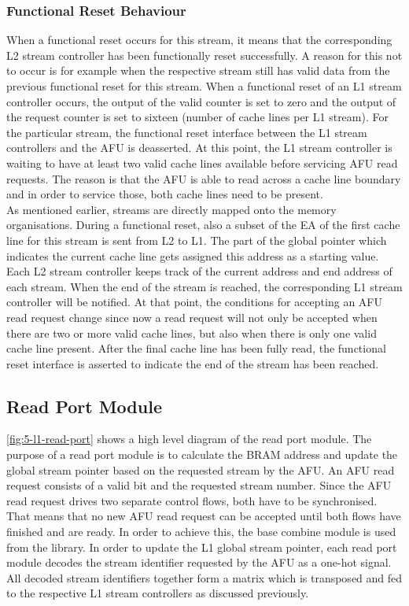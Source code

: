 \subsubsection{Functional Reset Behaviour}
When a functional reset occurs for this stream, it means that the corresponding L2 stream controller has been functionally reset successfully. A reason for this not to occur is for example when the respective stream still has valid data from the previous functional reset for this stream. When a functional reset of an L1 stream controller occurs, the output of the valid counter is set to zero and the output of the request counter is set to sixteen (number of cache lines per L1 stream). For the particular stream, the functional reset interface between the L1 stream controllers and the AFU is deasserted. At this point, the L1 stream controller is waiting to have at least two valid cache lines available before servicing AFU read requests. The reason is that the AFU is able to read across a cache line boundary and in order to service those, both cache lines need to be present.\\
As mentioned earlier, streams are directly mapped onto the memory organisations. During a functional reset, also a subset of the EA of the first cache line for this stream is sent from L2 to L1. The part of the global pointer which indicates the current cache line gets assigned this address as a starting value.\\
Each L2 stream controller keeps track of the current address and end address of each stream. When the end of the stream is reached, the corresponding L1 stream controller will be notified. At that point, the conditions for accepting an AFU read request change since now a read request will not only be accepted when there are two or more valid cache lines, but also when there is only one valid cache line present. After the final cache line has been fully read, the functional reset interface is asserted to indicate the end of the stream has been reached.



\subsection{Read Port Module}
\label{sec:rd-port}
\autoref{fig:5-l1-read-port} shows a high level diagram of the read port module. The purpose of a read port module is to calculate the BRAM address and update the global stream pointer based on the requested stream by the AFU. An AFU read request consists of a valid bit and the requested stream number. Since the AFU read request drives two separate control flows, both have to be synchronised. That means that no new AFU read request can be accepted until both flows have finished and are ready. In order to achieve this, the base combine module is used from the library. In order to update the L1 global stream pointer, each read port module decodes the stream identifier requested by the AFU as a one-hot signal. All decoded stream identifiers together form a matrix which is transposed and fed to the respective L1 stream controllers as discussed previously.

